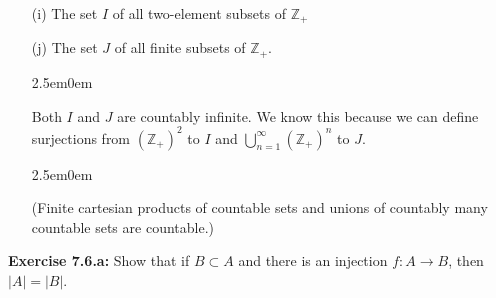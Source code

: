 \documentclass{book}
\newcommand{\exTwo}{%
\color{Purple}%
   \fontsize{13}{15}\selectfont%
}
\newenvironment{myIndent}{%
   \begin{adjustwidth}{2.5em}{0em}%
}{%
   \end{adjustwidth}%
}
\newcommand{\blab}[1]{\textbf{#1}}
\newcommand{\retTwo}{\hfill\bigbreak}
\begin{document}
\begin{itemize}
      \item[(i)] The set $I$ of all two-element subsets of $\mathbb{Z}_+$
      \item[(j)] The set $J$ of all finite subsets of $\mathbb{Z}_+$.
      
      \begin{myIndent}\exTwo
         Both $I$ and $J$ are countably infinite. We know this because we can define\\ surjections from $(\mathbb{Z_+})^2$ to $I$ and $\bigcup\limits_{n = 1}^\infty (\mathbb{Z}_+)^n$ to $J$.
         
         \begin{myIndent}
            (Finite cartesian products of countable sets and unions of countably many countable sets are countable.)\retTwo\retTwo
         \end{myIndent}
      \end{myIndent}
   \end{itemize}

   \blab{Exercise 7.6.a:} Show that if $B \subset A$ and there is an injection $f: A \longrightarrow B$, then $|A| = |B|$.
   
\end{document}
